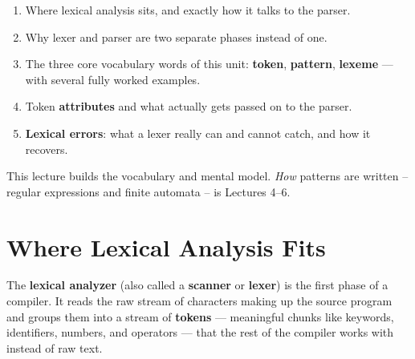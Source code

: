 \documentclass[11pt]{article}
\begin{document}
\makelecturetitle

\begin{coreidea}
\begin{enumerate}
  \item Where lexical analysis sits, and exactly how it talks to the parser.
  \item Why lexer and parser are two separate phases instead of one.
  \item The three core vocabulary words of this unit: \textbf{token}, \textbf{pattern},
  \textbf{lexeme} --- with several fully worked examples.
  \item Token \textbf{attributes} and what actually gets passed on to the parser.
  \item \textbf{Lexical errors}: what a lexer really can and cannot catch, and how it recovers.
\end{enumerate}
This lecture builds the vocabulary and mental model. \emph{How} patterns are written --
regular expressions and finite automata -- is Lectures 4--6.
\end{coreidea}

\section{Where Lexical Analysis Fits}

\dbtag The \textbf{lexical analyzer} (also called a \textbf{scanner} or \textbf{lexer}) is the
first phase of a compiler. It reads the raw stream of characters making up the source program
and groups them into a stream of \textbf{tokens} --- meaningful chunks like keywords,
identifiers, numbers, and operators --- that the rest of the compiler works with instead of raw
text.

\begin{center}
\end{center}
\end{document}
